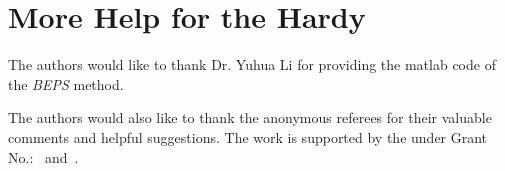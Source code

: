 \documentclass[sigconf]{acmart}
\begin{document}
\appendix



\section{More Help for the Hardy}
\appendix





\begin{acks}

  The authors would like to thank Dr. Yuhua Li for providing the
  matlab code of the \textit{BEPS} method.

  The authors would also like to thank the anonymous referees for
  their valuable comments and helpful suggestions. The work is
  supported by the  under Grant
  No.:~
  and~.

\end{acks}


 
\end{document}
